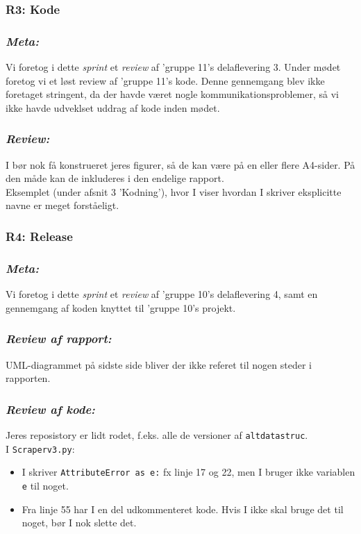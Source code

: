 \documentclass[12pt]{article}
\begin{document}
\subsubsection{R3: Kode}
\label{sec:bilag_review}
\subsubsection*{\textit{Meta:}}
Vi foretog i dette \textit{sprint} et \textit{review} af 'gruppe 11's delaflevering 3. Under mødet foretog vi et løst review af 'gruppe 11's kode. Denne gennemgang blev ikke foretaget stringent, da der havde været nogle kommunikationsproblemer, så vi ikke havde udveklset uddrag af kode inden mødet.

\subsubsection*{\textit{Review:}}
I bør nok få konstrueret jeres figurer, så de kan være på en eller flere A4-sider. På den måde kan de inkluderes i den endelige rapport. \\
Eksemplet (under afsnit 3 'Kodning'), hvor I viser hvordan I skriver eksplicitte navne er meget forståeligt. \\

\subsubsection{R4: Release}
\subsubsection*{\textit{Meta:}}
Vi foretog i dette \textit{sprint} et \textit{review} af 'gruppe 10's delaflevering 4, samt en gennemgang af koden knyttet til 'gruppe 10's projekt.

\subsubsection*{\textit{Review af rapport:}}
UML-diagrammet på sidste side bliver der ikke referet til nogen steder i rapporten.

\subsubsection*{\textit{Review af kode:}}
Jeres reposistory er lidt rodet, f.eks. alle de versioner af \texttt{altdatastruc}. \\
I \texttt{Scraperv3.py}:
\begin{itemize}
\item I skriver \texttt{AttributeError as e:} fx linje 17 og 22, men I bruger ikke variablen \texttt{e} til noget.
\item Fra linje 55 har I en del udkommenteret kode. Hvis I ikke skal bruge det til noget, bør I nok slette det.
\end{itemize}
\end{document}
